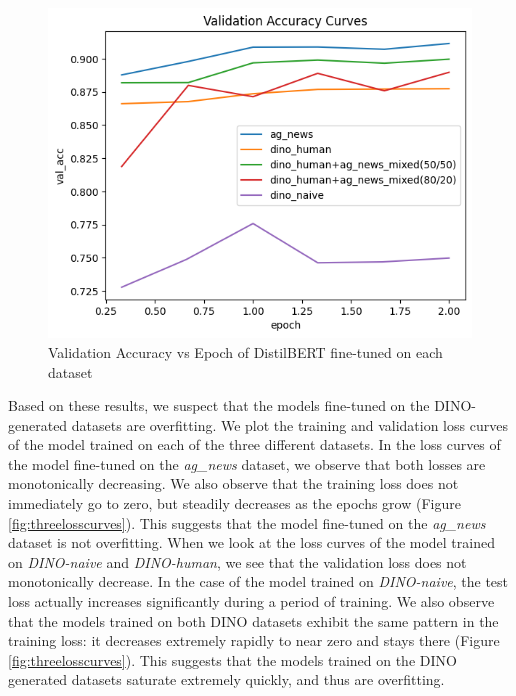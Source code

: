 \documentclass[11pt]{article}
\begin{document}
\begin{figure}[]
    \centering
    \includegraphics[width=0.99\linewidth]{Accuracy Curves.png}
    \caption{Validation Accuracy vs Epoch of DistilBERT fine-tuned on each dataset}
    \label{fig:Acccuracy Curves.png}
\end{figure}

Based on these results, we suspect that the models fine-tuned on the DINO-generated datasets are overfitting. We plot the training and validation loss curves of the model trained on each of the three different datasets. In the loss curves of the model fine-tuned on the \textit{ag\_news} dataset, we observe that both losses are monotonically decreasing. We also observe that the training loss does not immediately go to zero, but steadily decreases as the epochs grow (Figure \ref{fig:threelosscurves}). This suggests that the model fine-tuned on the \textit{ag\_news} dataset is not overfitting. When we look at the loss curves of the model trained on \textit{DINO-naive} and \textit{DINO-human}, we see that the validation loss does not monotonically decrease. In the case of the model trained on \textit{DINO-naive}, the test loss actually increases significantly during a period of training. We also observe that the models trained on both DINO datasets exhibit the same pattern in the training loss: it decreases extremely rapidly to near zero and stays there (Figure \ref{fig:threelosscurves}). This suggests that the models trained on the DINO generated datasets saturate extremely quickly, and thus are overfitting.
\end{document}
